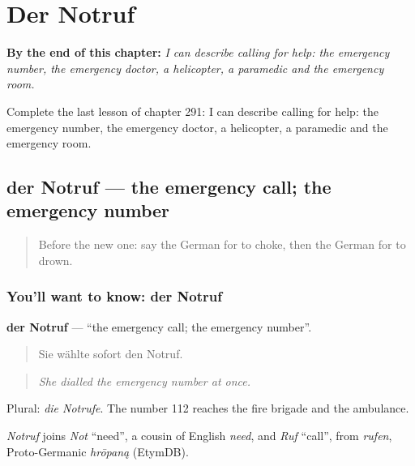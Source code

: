 
\chapter{Der Notruf}
\label{ch:ge-der-notruf}

\begin{chapteropening}
\textbf{By the end of this chapter:} \emph{I can describe calling for help: the emergency number, the emergency doctor, a helicopter, a paramedic and the emergency room.}

Complete the last lesson of chapter 291: I can describe calling for help: the emergency number, the emergency doctor, a helicopter, a paramedic and the emergency room.
\end{chapteropening}

\section[der Notruf]{der Notruf — the emergency call; the emergency number}

\label{lesson:GE-C291-notruf}



\begin{quote}
Before the new one: say the German for to choke, then the German for to drown.
\end{quote}

\subsection*{You'll want to know: der Notruf}
\textbf{der Notruf} — \textquotedblleft{}the emergency call; the emergency number\textquotedblright{}.

\begin{quote}
Sie wählte sofort den Notruf.
\end{quote}

\begin{quote}
\emph{She dialled the emergency number at once.}
\end{quote}

Plural: \emph{die Notrufe}. The number 112 reaches the fire brigade and the ambulance.

\begin{cousinweb}
\emph{Notruf} joins \emph{Not} \textquotedblleft{}need\textquotedblright{}, a cousin of English \emph{need}, and \emph{Ruf} \textquotedblleft{}call\textquotedblright{}, from \emph{rufen}, Proto-Germanic \emph{hrōpaną} (EtymDB).
\end{cousinweb}

